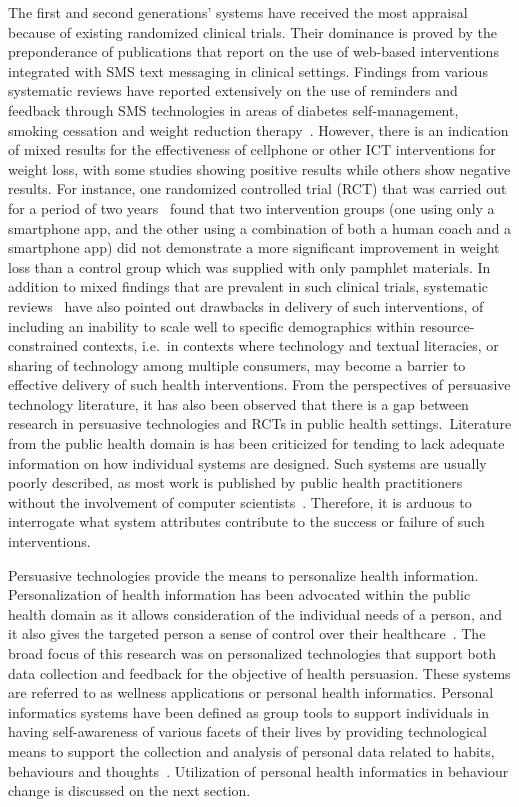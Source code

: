 The first and second generations' systems have received the most appraisal because of existing randomized clinical trials. Their dominance is proved by the preponderance of publications that report on the use of web-based interventions integrated with SMS text messaging in clinical settings. Findings from various systematic reviews have reported extensively on the use of reminders and feedback through SMS technologies in areas of diabetes self-management, smoking cessation and weight reduction therapy~\citep{cole2010text,fjeldsoe2009behavior,krishna2009healthcare}. However, there is an indication of mixed results for the effectiveness of cellphone or other ICT interventions for weight loss, with some studies showing positive results while others show negative results. For instance, one randomized controlled trial (RCT) that was carried out for a period of two years~\citep{svetkey2015cell} found that two intervention groups (one using only a smartphone app, and the other using a combination of both a human coach and a smartphone app) did not demonstrate a more significant improvement in weight loss than a control group which was supplied with only pamphlet materials. In addition to mixed findings that are prevalent in such clinical trials, systematic reviews~\citep{cole2010text,kaplan2006can} have also pointed out drawbacks in delivery of such interventions, of including an inability to scale well to specific demographics within resource-constrained contexts, i.e.~in contexts where technology and textual literacies, or sharing of technology among multiple consumers, may become a barrier to effective delivery of such health interventions. From the perspectives of persuasive technology literature, it has also been observed that there is a gap between research in persuasive technologies and RCTs in public health settings.~Literature from the public health domain is has been criticized for tending to lack adequate information on how individual systems are designed. Such systems are usually poorly described, as most work is published by public health practitioners without the involvement of computer scientists~\citep{Oinas-Kukkonen:foundation}. Therefore, it is arduous to interrogate what system attributes contribute to the success or failure of such interventions. 

Persuasive technologies provide the means to personalize health information. Personalization of health information has been advocated within the public health domain as it allows consideration of the individual needs of a person, and it also gives the targeted person a  sense of control over their healthcare~\citep{mccallum2012gamification}. The broad focus of this research was on  personalized technologies that support both  data collection and feedback for the objective of health persuasion. These systems are referred to as wellness applications or personal health informatics. Personal informatics systems have been defined as group tools to support individuals in having self-awareness of various facets of their lives by providing technological means to support the collection and analysis of personal data related to habits, behaviours and thoughts~\citep{li2011personal,li2012personal}. Utilization of personal health informatics in behaviour change is discussed on the next section. 
